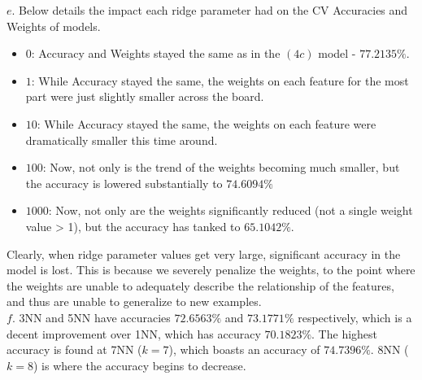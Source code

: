 \documentclass[11pt]{article}
\begin{document}
\noindent $e.$ Below details the impact each ridge parameter had on the CV Accuracies and Weights of models.
\begin{itemize}
\item $0$: Accuracy and Weights stayed the same as in the $(4c)$ model - $77.2135\%$.
\item $1$: While Accuracy stayed the same, the weights on each feature for the most part were just slightly smaller across the board.
\item $10$: While Accuracy stayed the same, the weights on each feature were dramatically smaller this time around.
\item $100$: Now, not only is the trend of the weights becoming much smaller, but the accuracy is lowered substantially to $74.6094\%$
\item $1000$: Now, not only are the weights significantly reduced (not a single weight value > 1), but the accuracy has tanked to $65.1042\%$. 
\end{itemize}

Clearly, when ridge parameter values get very large, significant accuracy in the model is lost. This is because we severely penalize the weights, to the point where the weights are unable to adequately describe the relationship of the features, and thus are unable to generalize to new examples.\\

\noindent $f.$ 3NN and 5NN have accuracies $72.6563\%$ and $73.1771\%$ respectively, which is a decent improvement over 1NN, which has accuracy $70.1823\%$. The highest accuracy is found at 7NN ($k = 7$), which boasts an accuracy of $74.7396\%$. 8NN ($k = 8$) is where the accuracy begins to decrease.
\end{document}
